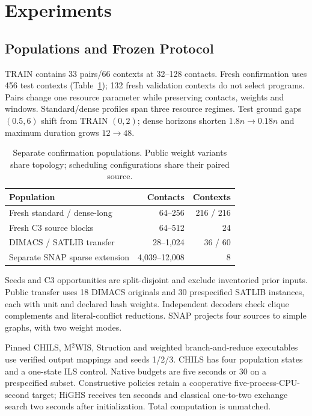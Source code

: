 \section{Experiments}
\label{sec:experiments}

\subsection{Populations and Frozen Protocol}
\label{sec:experiments:protocol}
TRAIN contains 33 pairs/66 contexts at 32--128 contacts. Fresh confirmation
uses 456 test contexts (Table~\ref{tab:study-protocol}); 132 fresh validation
contexts do not select programs. Pairs change one resource parameter while
preserving contacts, weights and windows. Standard/dense profiles span three
resource regimes. Test ground gaps $(0.5,6)$ shift from TRAIN $(0,2)$;
dense horizons shorten $1.8n\to0.18n$ and maximum duration grows $12\to48$.

\begin{table}[t]
\centering
\caption{Separate confirmation populations. Public weight variants share
topology; scheduling configurations share their paired source.}
\label{tab:study-protocol}
\small
\begin{tabular}{lrr}
\toprule
Population & Contacts & Contexts \\
\midrule
Fresh standard / dense-long & 64--256 & 216 / 216 \\
Fresh C3 source blocks & 64--512 & 24 \\
DIMACS / SATLIB transfer & 28--1,024 & 36 / 60 \\
Separate SNAP sparse extension & 4,039--12,008 & 8 \\
\bottomrule
\end{tabular}
\end{table}

Seeds and C3 opportunities are split-disjoint and exclude inventoried prior
inputs. Public transfer uses 18 DIMACS originals and 30 prespecified SATLIB
instances, each with unit and declared hash weights. Independent decoders check
clique complements and literal-conflict reductions. SNAP projects four sources
to simple graphs, with two weight modes.

Pinned CHILS, M$^2$WIS, Struction and weighted branch-and-reduce executables
use verified output mappings and seeds 1/2/3. CHILS has four population states
and a one-state ILS control. Native budgets are five seconds or 30 on a
prespecified subset. Constructive policies retain a cooperative five-process-CPU-second
target; HiGHS receives ten seconds and classical one-to-two exchange search
two seconds after initialization. Total computation is unmatched.

